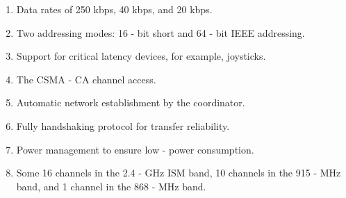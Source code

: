 \begin{enumerate}[label=\roman*]
  \item	Data rates of 250 kbps, 40 kbps, and 20 kbps.
  \item	Two addressing modes: 16 - bit short and 64 - bit IEEE addressing. 
  \item Support for critical latency devices, for example, joysticks.
  \item	The CSMA - CA channel access.
  \item	Automatic network establishment by the coordinator.
  \item	Fully handshaking protocol for transfer reliability.
  \item	Power management to ensure low - power consumption.
  \item	Some 16 channels in the 2.4 - GHz ISM band, 10 channels in the 915 - MHz band, and 1 channel in the 868 - MHz band.
\end{enumerate}

